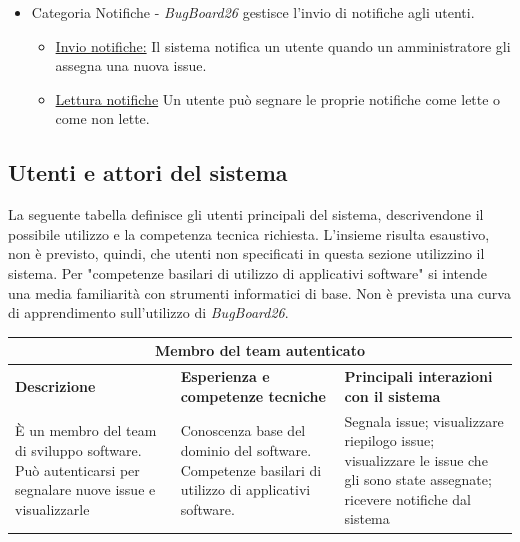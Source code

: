 \documentclass[a4paper,12pt]{article}
\begin{document}
\begin{itemize}
\begin{itemize}
        \item \hyperref[sec:RE07]{Visualizza issue utente:} Gli utenti autenticati possono visualizzare le issue assegnategli da un amministratore.
        \item\hyperref[sec:RE11]{Visualizza notifiche:}  Il sistema fornisce una dashboard per la visualizzazione e gestione delle proprie notifiche.
    \end{itemize}
    \item Categoria Notifiche -  \textit{BugBoard26}  gestisce l'invio di notifiche agli utenti.
    \begin{itemize}
        \item \hyperref[sec:RE04]{Invio notifiche:}  Il sistema notifica un utente quando un amministratore gli assegna una nuova issue.
        \item \hyperref[sec:RE12]{Lettura notifiche}  Un utente può segnare le proprie notifiche come lette o come non lette.
    \end{itemize}
\end{itemize}

\subsection{Utenti e attori del sistema} 
\label{sec:attori}
La seguente tabella definisce gli utenti principali del sistema, descrivendone il possibile utilizzo e la competenza tecnica richiesta. L'insieme risulta esaustivo, non è 
previsto, quindi, che utenti non specificati in questa sezione utilizzino il sistema. Per "competenze basilari di utilizzo di applicativi software" si intende 
una media familiarità con strumenti informatici di base. Non è prevista una curva di apprendimento sull'utilizzo di \textit{BugBoard26}.\\ 

\begin{tabularx}{\textwidth}{|X|X|X|}
\hline
\multicolumn{3}{|c|}{\textbf{Membro del team autenticato}} \\ \hline
\textbf{Descrizione} & \textbf{Esperienza e competenze tecniche} & \textbf{Principali interazioni con il sistema} \\ \hline
È un membro del team di sviluppo software. Può autenticarsi per segnalare nuove issue e visualizzarle & Conoscenza base del dominio del software. Competenze basilari di utilizzo di applicativi software. & Segnala issue; visualizzare riepilogo issue; 
visualizzare le issue che gli sono state assegnate; ricevere notifiche dal sistema \\ \hline
\end{tabularx}
\end{document}
